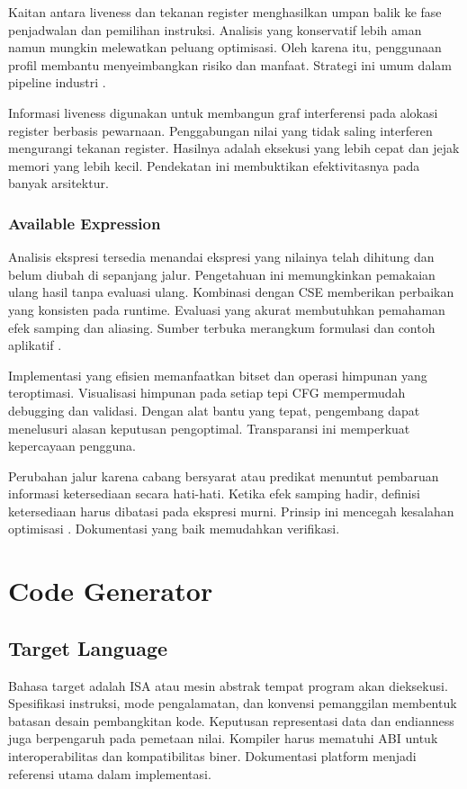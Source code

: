 \documentclass[../main.tex]{subfiles}
\begin{document}
Kaitan antara liveness dan tekanan register menghasilkan umpan balik ke fase penjadwalan dan pemilihan instruksi. Analisis yang konservatif lebih aman namun mungkin melewatkan peluang optimisasi. Oleh karena itu, penggunaan profil membantu menyeimbangkan risiko dan manfaat. Strategi ini umum dalam pipeline industri \citep{LLVMOverview}.

Informasi liveness digunakan untuk membangun graf interferensi pada alokasi register berbasis pewarnaan. Penggabungan nilai yang tidak saling interferen mengurangi tekanan register. Hasilnya adalah eksekusi yang lebih cepat dan jejak memori yang lebih kecil. Pendekatan ini membuktikan efektivitasnya pada banyak arsitektur.

\subsubsection{Available Expression}
Analisis ekspresi tersedia menandai ekspresi yang nilainya telah dihitung dan belum diubah di sepanjang jalur. Pengetahuan ini memungkinkan pemakaian ulang hasil tanpa evaluasi ulang. Kombinasi dengan CSE memberikan perbaikan yang konsisten pada runtime. Evaluasi yang akurat membutuhkan pemahaman efek samping dan aliasing. Sumber terbuka merangkum formulasi dan contoh aplikatif \citep{WikiAvailableExpr}.

Implementasi yang efisien memanfaatkan bitset dan operasi himpunan yang teroptimasi. Visualisasi himpunan pada setiap tepi CFG mempermudah debugging dan validasi. Dengan alat bantu yang tepat, pengembang dapat menelusuri alasan keputusan pengoptimal. Transparansi ini memperkuat kepercayaan pengguna.

Perubahan jalur karena cabang bersyarat atau predikat menuntut pembaruan informasi ketersediaan secara hati-hati. Ketika efek samping hadir, definisi ketersediaan harus dibatasi pada ekspresi murni. Prinsip ini mencegah kesalahan optimisasi \citep{WikiAvailableExpr}. Dokumentasi yang baik memudahkan verifikasi.

\section{Code Generator}
\subsection{Target Language}
Bahasa target adalah ISA atau mesin abstrak tempat program akan dieksekusi. Spesifikasi instruksi, mode pengalamatan, dan konvensi pemanggilan membentuk batasan desain pembangkitan kode. Keputusan representasi data dan endianness juga berpengaruh pada pemetaan nilai. Kompiler harus mematuhi ABI untuk interoperabilitas dan kompatibilitas biner. Dokumentasi platform menjadi referensi utama dalam implementasi.
\end{document}
